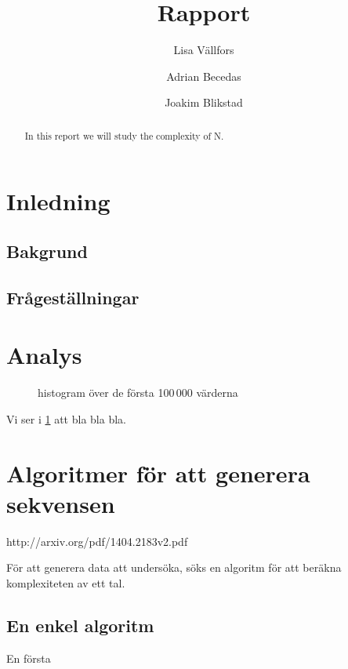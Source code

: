 \documentclass[a4paperi,titlepage,onesided,draft]{article}
\title{Rapport}
\author{Lisa Vällfors \and Adrian Becedas \and Joakim Blikstad}
\begin{document}
\maketitle

\begin{abstract}
    In this report we will study the complexity of N.
\end{abstract}

\tableofcontents 
\newpage

\section{Inledning}

\subsection{Bakgrund}

\subsection{Frågeställningar}


\section{Analys}

\begin{figure}[h]
\centering
\resizebox{\columnwidth}{!}{
    
}
\caption{histogram över de första 100\,000 värderna}
\label{fig:normal}
\end{figure}

Vi ser i \cref{fig:normal} att bla bla bla.

\section{Algoritmer för att generera sekvensen}

http://arxiv.org/pdf/1404.2183v2.pdf

För att generera data att undersöka, söks en algoritm för att beräkna komplexiteten av ett tal.

\subsection{En enkel algoritm}

En första 
\end{document}
